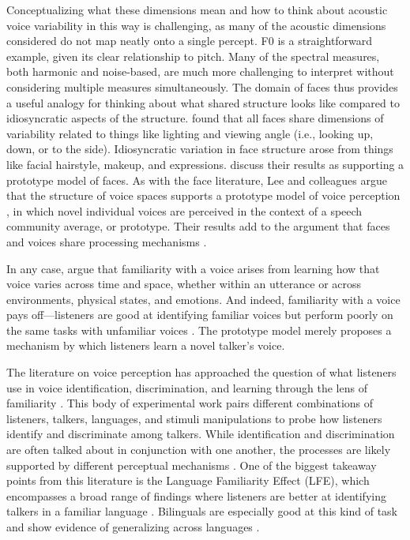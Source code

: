 Conceptualizing what these dimensions mean and how to think about acoustic voice variability in this way is challenging, as many of the acoustic dimensions considered do not map neatly onto a single percept. F0 is a straightforward example, given its clear relationship to pitch. Many of the spectral measures, both harmonic and noise-based, are much more challenging to interpret without considering multiple measures simultaneously. The domain of faces thus provides a useful analogy for thinking about what shared structure looks like compared to idiosyncratic aspects of the structure. \citet{burton_2016_faces} found that all faces share dimensions of variability related to things like lighting and viewing angle (i.e., looking up, down, or to the side). Idiosyncratic variation in face structure arose from things like facial hairstyle, makeup, and expressions. \citet{burton_2016_faces} discuss their results as supporting a prototype model of faces. As with the face literature, Lee and colleagues argue that the structure of voice spaces supports a prototype model of voice perception \citep{lavner_2001_prototype, latinus_2011_voice}, in which novel individual voices are perceived in the context of a speech community average, or prototype. Their results add to the argument that faces and voices share processing mechanisms \citep{yovel_2013_unified}.

In any case, \citet{lee_2019_acoustic} argue that familiarity with a voice arises from learning how that voice varies across time and space, whether within an utterance or across environments, physical states, and emotions. And indeed, familiarity with a voice pays off---listeners are good at identifying familiar voices but perform poorly on the same tasks with unfamiliar voices \citep{nygaard_1998_talker}. The prototype model merely proposes a mechanism by which listeners learn a novel talker's voice. 

The literature on voice perception has approached the question of what listeners use in voice identification, discrimination, and learning through the lens of familiarity \citep{levi_2019_methodological, perrachione_2018_recognizing}. This body of experimental work pairs different combinations of listeners, talkers, languages, and stimuli manipulations to probe how listeners identify and discriminate among talkers. While identification and discrimination are often talked about in conjunction with one another, the processes are likely supported by different perceptual mechanisms \citep{perrachione_2019_judgments}. One of the biggest takeaway points from this literature is the Language Familiarity Effect (LFE), which encompasses a broad range of findings where listeners are better at identifying talkers in a familiar language \citep[for a recent review, see][]{perrachione_2018_recognizing}. Bilinguals are especially good at this kind of task and show evidence of generalizing across languages \citep{orena_2019_identifying}. 

